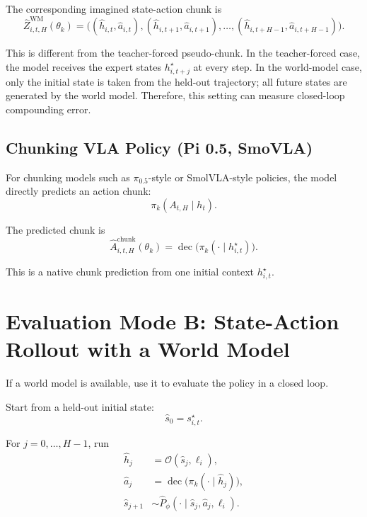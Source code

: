 \documentclass[11pt]{article}
\begin{document}
The corresponding imagined state-action chunk is
\begin{equation}
\widehat{Z}^{\mathrm{WM}}_{i,t,H}(\theta_k)
=
\bigl(
(\widehat{h}_{i,t},\widehat{a}_{i,t}),
(\widehat{h}_{i,t+1},\widehat{a}_{i,t+1}),
\ldots,
(\widehat{h}_{i,t+H-1},\widehat{a}_{i,t+H-1})
\bigr).
\end{equation}

This is different from the teacher-forced pseudo-chunk. In the teacher-forced case,
the model receives the expert states $h^{\star}_{i,t+j}$ at every step. In the
world-model case, only the initial state is taken from the held-out trajectory; all
future states are generated by the world model. Therefore, this setting can measure
closed-loop compounding error.

\subsection{Chunking VLA Policy (Pi 0.5, SmoVLA)}

For chunking models such as $\pi_{0.5}$-style or SmolVLA-style policies, the model directly predicts an action chunk:
\begin{equation}
\pi_k(A_{t,H}\mid h_t).
\end{equation}

The predicted chunk is
\begin{equation}
\widehat{A}^{\mathrm{chunk}}_{i,t,H}(\theta_k)
=
\operatorname{dec}\bigl(\pi_k(\cdot\mid h^{\star}_{i,t})\bigr).
\end{equation}

This is a native chunk prediction from one initial context $h^{\star}_{i,t}$.

\section{Evaluation Mode B: State-Action Rollout with a World Model}

If a world model is available, use it to evaluate the policy in a closed loop.

Start from a held-out initial state:
\begin{equation}
\hat{s}_0=s^{\star}_{i,t}.
\end{equation}

For $j=0,\ldots,H-1$, run
\begin{align}
\hat{h}_j &= \mathcal{O}(\hat{s}_j,\ell_i), \\
\hat{a}_j &= \operatorname{dec}\bigl(\pi_k(\cdot\mid \hat{h}_j)\bigr), \\
\hat{s}_{j+1} &\sim \widehat{P}_{\phi}(\cdot\mid \hat{s}_j,\hat{a}_j,\ell_i).
\end{align}
\end{document}

